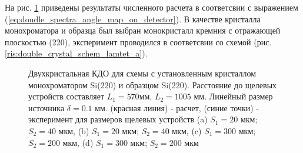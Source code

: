 
\label{sec:non_disspers_KDO_section}
На рис. \ref{ris:non_disspers_kdo} приведены результаты численного расчета в соответсвии
с выражением (\ref{eq:doudle_spectra_angle_map_on_detector}). В качестве кристалла монохроматора
и образца был выбран монокристалл кремния с отражающей плоскостью (220), эксперимент проводился в
соответсвии со схемой (рис. \ref{ris:double_crystal_schem_lamtet_a}).

\begin{figure}[H]
  \centering
  \hfill
  \hfill
  \hfill
  \caption{Двухкристальная КДО для схемы с установленным кристаллом монохроматором Si(220) и образцом  Si(220). Расстояние до щелевых устройств
  составляет $L_1= 570 $мм, $L_2 = 1005$ мм. Линейный размер источника $\delta = 0.1$ мм. (красная линия) - расчет, (синие точки) - эксперимент
  для размеров щелевых устройств (a) $S_1 = 20 $ мкм; $ S_2 = 40$ мкм, (b) $S_1 = 20 $ мкм; $ S_2 = 40$ мкм,
  (c) $S_1 = 300 $ мкм; $ S_2 = 200$ мкм, (d) $S_1 = 300 $ мкм; $ S_2 = 200$ мкм}
  \label{ris:non_disspers_kdo}
\end{figure}


